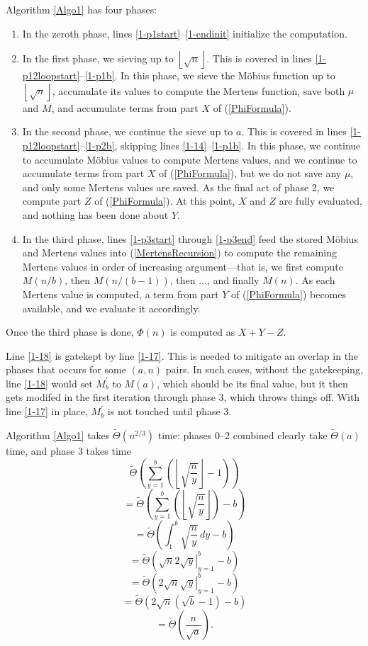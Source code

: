 \documentclass[12pt]{article}
\newcommand{\eqn}[1]{\begin{displaymath} #1 \end{displaymath}}
\newcommand{\floor}[1]{{\left\lfloor #1 \right\rfloor}}
\newcommand{\integral}[4]{\displaystyle\int_{#3}^{#4} \! #1 \, d#2}
\newcommand{\eval}[3]{\left. #1 \right|_{#2}^{#3}}
\newcommand{\isqrt}[1]{\floor{\sqrt{#1}}}
\newcommand{\softTheta}[0]{\widetilde{\Theta}}
\begin{document}
Algorithm \ref{Algo1} has four phases:
\begin{enumerate} \addtocounter{enumi}{-1}
\item In the zeroth phase, lines \ref{1-p1start}--\ref{1-endinit} initialize the computation.
\item In the first phase, we sieving up to $\isqrt{n}$.  This is covered in lines \ref{1-p12loopstart}--\ref{1-p1b}.  In this phase, we sieve the M\"{o}bius function up to $\isqrt{n}$, accumulate its values to compute the Mertens function, save both $\mu$ and $M$, and accumulate terms from part $X$ of (\ref{PhiFormula}).
\item In the second phase, we continue the sieve up to $a$.  This is covered in lines \ref{1-p12loopstart}--\ref{1-p2b}, skipping lines \ref{1-14}--\ref{1-p1b}.  In this phase, we continue to accumulate M\"{o}bius values to compute Mertens values, and we continue to accumulate terms from part $X$ of (\ref{PhiFormula}), but we do not save any $\mu$, and only some Mertens values are saved.  As the final act of phase 2, we compute part $Z$ of (\ref{PhiFormula}).  At this point, $X$ and $Z$ are fully evaluated, and nothing has been done about $Y$.
\item In the third phase, lines \ref{1-p3start} through \ref{1-p3end} feed the stored M\"{o}bius and Mertens values into (\ref{MertensRecursion}) to compute the remaining Mertens values in order of increasing argument---that is, we first compute $M(n/b)$, then $M(n/(b-1))$, then ..., and finally $M(n)$.  As each Mertens value is computed, a term from part $Y$ of (\ref{PhiFormula}) becomes available, and we evaluate it accordingly.
\end{enumerate}
Once the third phase is done, $\Phi(n)$ is computed as $X+Y-Z$.

Line \ref{1-18} is gatekept by line \ref{1-17}.  This is needed to mitigate an overlap in the phases that occurs for some $(a,n)$ pairs.  In such cases, without the gatekeeping, line \ref{1-18} would set $M^\prime_b$ to $M(a)$, which should be its final value, but it then gets modifed in the first iteration through phase 3, which throws things off.  With line \ref{1-17} in place, $M^\prime_b$ is not touched until phase 3.

Algorithm \ref{Algo1} takes $\softTheta(n^{2/3})$ time: phases 0--2 combined clearly take $\softTheta(a)$ time, and phase 3 takes time
\eqn{\softTheta \left( \sum_{y=1}^b \left( \isqrt{\frac{n}{y}} - 1 \right) \right)}
\eqn{= \softTheta \left( \sum_{y=1}^b \left( \isqrt{\frac{n}{y}} \right) - b \right)}
\eqn{= \softTheta \left( \integral{ \sqrt{\frac{n}{y}} }{y}{1}{b} - b \right)}
\eqn{= \softTheta \left( \sqrt{n} 2 \eval{\sqrt{y}}{y=1}{b} - b \right)}
\eqn{= \softTheta \left( 2 \sqrt{n} \eval{\sqrt{y}}{y=1}{b} - b \right)}
\eqn{= \softTheta \left( 2 \sqrt{n} \left( \sqrt{b} - 1 \right) - b \right)}
\eqn{= \softTheta \left( \frac{n}{\sqrt{a}} \right).}
\end{document}
